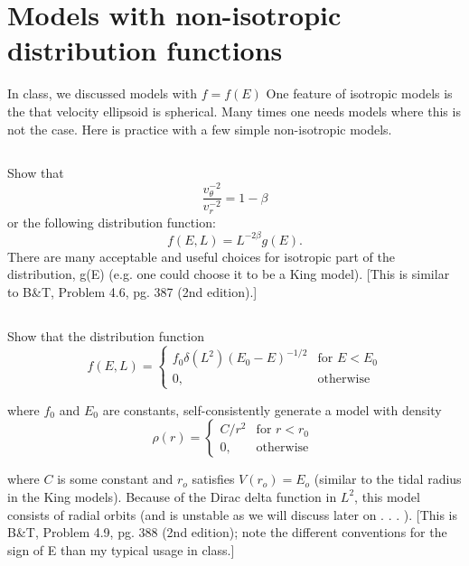 \section{Models with non-isotropic distribution functions}

In class, we discussed
models with $f=f(E)$ One feature of isotropic models is the that velocity ellipsoid is spherical. Many times one needs models where this
is not the case. Here is practice with a few simple non-isotropic models.

\subsection{}
Show that
\begin{equation}
    \frac{v^{-2}_\theta}{v^{-2}_r}=1-\beta
\end{equation}
or the following distribution function:
\begin{equation}
    f(E,L)=L^{-2\beta}g(E).
\end{equation}
There are many acceptable and useful choices for isotropic part
of the distribution, g(E) (e.g. one could choose it to be a King
model). [This is similar to B\&T, Problem 4.6, pg. 387 (2nd edition).]


\subsection{}
Show that the distribution function
\begin{equation}
    f(E,L) = \left\{\begin{array}{lr}
        f_0\delta(L^2)(E_0-E)^{-1/2} & \text{for } E< E_0\\
        0, & \text{otherwise }
        \end{array}\right.
\end{equation}

where $f_0$ and $E_0$ are constants, self-consistently generate a model
with density
\begin{equation}
        \rho(r) = \left\{\begin{array}{lr}
        C/r^2 & \text{for } r< r_0\\
        0, & \text{otherwise }
        \end{array}\right.
\end{equation}

where $C$ is some constant and $r_o$ satisfies $V(r_o) = E_o$ (similar to
the tidal radius in the King models). Because of the Dirac delta
function in $L^2$, this model consists of radial orbits (and is unstable
as we will discuss later on . . . ). [This is B\&T, Problem 4.9, pg.
388 (2nd edition); note the different conventions for the sign of E
than my typical usage in class.]

